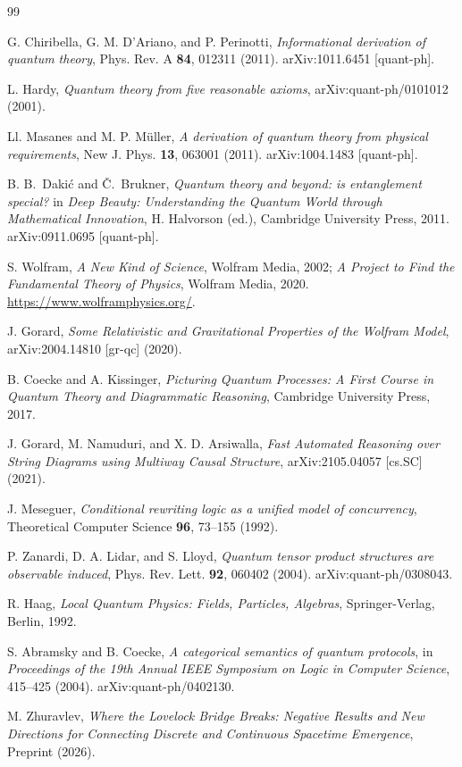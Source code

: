 \documentclass[11pt,a4paper]{article}
\theoremstyle{definition}
\theoremstyle{remark}
\begin{document}
\begin{thebibliography}{99}

G. Chiribella, G. M. D'Ariano, and P. Perinotti,
\textit{Informational derivation of quantum theory},
Phys. Rev. A \textbf{84}, 012311 (2011).
arXiv:1011.6451 [quant-ph].

L. Hardy,
\textit{Quantum theory from five reasonable axioms},
arXiv:quant-ph/0101012 (2001).

Ll. Masanes and M. P. Müller,
\textit{A derivation of quantum theory from physical requirements},
New J. Phys. \textbf{13}, 063001 (2011).
arXiv:1004.1483 [quant-ph].

B. B.\ Daki\'{c} and \v{C}.\ Brukner,
\textit{Quantum theory and beyond: is entanglement special?}
in \textit{Deep Beauty: Understanding the Quantum World through Mathematical Innovation},
H. Halvorson (ed.), Cambridge University Press, 2011.
arXiv:0911.0695 [quant-ph].

S. Wolfram,
\textit{A New Kind of Science},
Wolfram Media, 2002;
\textit{A Project to Find the Fundamental Theory of Physics},
Wolfram Media, 2020.
\url{https://www.wolframphysics.org/}.

J. Gorard,
\textit{Some Relativistic and Gravitational Properties of the Wolfram Model},
arXiv:2004.14810 [gr-qc] (2020).

B. Coecke and A. Kissinger,
\textit{Picturing Quantum Processes: A First Course in Quantum Theory and Diagrammatic Reasoning},
Cambridge University Press, 2017.

J. Gorard, M. Namuduri, and X. D. Arsiwalla,
\textit{Fast Automated Reasoning over String Diagrams using Multiway Causal Structure},
arXiv:2105.04057 [cs.SC] (2021).

J. Meseguer,
\textit{Conditional rewriting logic as a unified model of concurrency},
Theoretical Computer Science \textbf{96}, 73--155 (1992).

P. Zanardi, D. A. Lidar, and S. Lloyd,
\textit{Quantum tensor product structures are observable induced},
Phys. Rev. Lett. \textbf{92}, 060402 (2004).
arXiv:quant-ph/0308043.

R. Haag,
\textit{Local Quantum Physics: Fields, Particles, Algebras},
Springer-Verlag, Berlin, 1992.

S. Abramsky and B. Coecke,
\textit{A categorical semantics of quantum protocols},
in \textit{Proceedings of the 19th Annual IEEE Symposium on Logic in Computer Science}, 415--425 (2004).
arXiv:quant-ph/0402130.

M. Zhuravlev,
\textit{Where the Lovelock Bridge Breaks: Negative Results and New Directions for Connecting Discrete and Continuous Spacetime Emergence},
Preprint (2026).

\end{thebibliography}
\end{document}
